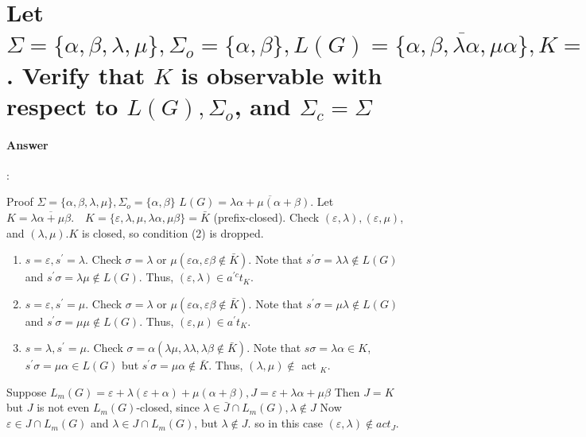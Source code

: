 \documentclass{article}
\begin{document}
\section{Let $\Sigma=\{\alpha, \beta, \lambda, \mu\}, \Sigma_o=\{\alpha, \beta\}, L(G)=\overline{\{\alpha, \beta, \lambda \alpha, \mu \alpha\}}, K=\overline{\{\alpha, \lambda \alpha\}}$. Verify that $K$ is observable with respect to $L(G), \Sigma_o$, and $\Sigma_c=\Sigma$}

\paragraph{Answer}:

Proof $\Sigma=\{\alpha, \beta, \lambda, \mu\}, \Sigma_o=\{\alpha, \beta\}$ $L(G)=\overline{\lambda \alpha+\mu(\alpha+\beta)}$. Let $K=\overline{\lambda \alpha+\mu \beta} . \quad K=\{\varepsilon, \lambda, \mu, \lambda \alpha, \mu \beta\}=\bar{K}$ (prefix-closed). Check $(\varepsilon, \lambda),(\varepsilon, \mu)$, and $(\lambda, \mu) . K$ is closed, so condition (2) is dropped.

\begin{enumerate}
  \item  $s=\varepsilon, s^{\prime}=\lambda$. Check $\sigma=\lambda$ or $\mu(\varepsilon \alpha, \varepsilon \beta \notin \bar{K})$. Note that $s^{\prime} \sigma=\lambda \lambda \notin L(G)$ and $s^{\prime} \sigma=\lambda \mu \notin L(G)$. Thus, $(\varepsilon, \lambda) \in a^{\prime c} t_K$.
  \item $s=\varepsilon, s^{\prime}=\mu$. Check $\sigma=\lambda$ or $\mu(\varepsilon \alpha, \varepsilon \beta \notin \bar{K})$. Note that $s^{\prime} \sigma=\mu \lambda \notin L(G)$ and $s^{\prime} \sigma=\mu \mu \notin L(G)$. Thus, $(\varepsilon, \mu) \in a^{\prime} t_K$.
  \item $s=\lambda, s^{\prime}=\mu$. Check $\sigma=\alpha(\lambda \mu, \lambda \lambda, \lambda \beta \notin \bar{K})$. Note that $s \sigma=\lambda \alpha \in K$, $s^{\prime} \sigma=\mu \alpha \in L(G)$ but $s^{\prime} \sigma=\mu \alpha \notin \bar{K}$. Thus, $(\lambda, \mu) \notin$ act ${ }_K$.
\end{enumerate}

Suppose $L_m(G)=\varepsilon+\lambda(\varepsilon+\alpha)+\mu(\alpha+\beta), J=\varepsilon+\lambda \alpha+\mu \beta$ Then $J=K$ but $J$ is not even $L_m(G)$-closed, since $\lambda \in \bar{J} \cap L_m(G), \lambda \notin J$ Now $\varepsilon \in J \cap L_m(G)$ and $\lambda \in J \cap L_m(G)$, but $\lambda \notin J$. so in this case $(\varepsilon, \lambda) \notin a c t_J$.
\end{document}
